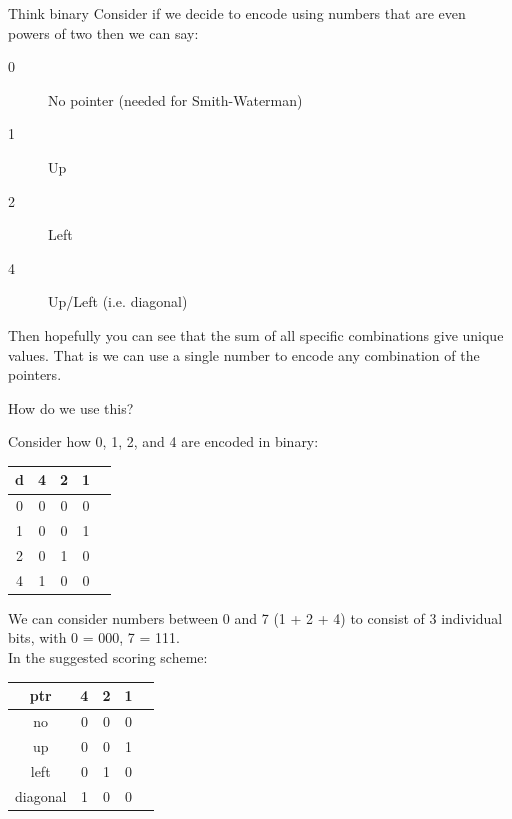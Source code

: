 \documentclass[pdf]{beamer}
\begin{document}
\begin{frame}[fragile]{Think binary}
  Consider if we decide to encode using numbers that are even powers of two
  then we can say:

  \begin{description}
  \item[0] No pointer (needed for Smith-Waterman)
  \item[1] Up
  \item[2] Left
  \item[4] Up/Left (i.e. diagonal)
  \end{description}
  
  Then hopefully you can see that the sum of all specific combinations give
  unique values. That is we can use a single number to encode any combination
  of the pointers.
\end{frame}

\begin{frame}[fragile]{How do we use this?}
  \small{
  Consider how 0, 1, 2, and 4 are encoded in binary:

  \begin{tabular}{ c|cccc }
    d & 4 & 2 & 1\\
    \hline
    0 & 0 & 0 & 0\\
    1 & 0 & 0 & 1\\
    2 & 0 & 1 & 0\\
    4 & 1 & 0 & 0
  \end{tabular}

  We can consider numbers between 0 and 7 (1 + 2 + 4) to consist of 3
  individual bits, with 0 = 000, 7 = 111.\\
  
  \pause
  \vspace{0.5cm}
  In the suggested scoring scheme:

  \begin{tabular}{ c|cccc }
    ptr & 4 & 2 & 1\\
    \hline
    no & 0 & 0 & 0\\
    up & 0 & 0 & 1\\
    left & 0 & 1 & 0\\
    diagonal & 1 & 0 & 0
  \end{tabular}
  }
\end{frame}
\end{document}
